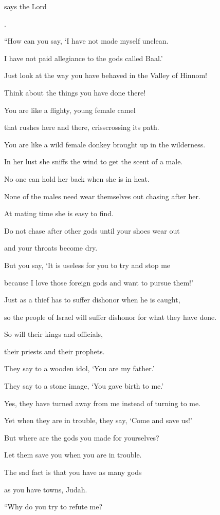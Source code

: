 {\par }{\Q says
the Lord

{}.
\par }{\Q {}“How
can you say,
‘I have not
made myself unclean.
\par }{\Q I have not
paid allegiance
to the gods called Baal.’
\par }{\Q Just look
at the way
you
have behaved in the Valley
of Hinnom!

\par }{\Q Think about the things you have
done
there!
\par }{\Q You are like a flighty,
young female camel
\par }{\Q that rushes here and there, crisscrossing
its path.
\par }{\Q {}You are like a wild female donkey
brought up
in the wilderness.
\par }{\Q In her lust
she sniffs
the wind
to get the scent of a male.

\par }{\Q No
one can
hold her back
when she is
in heat.
\par }{\Q None
of the males need wear themselves out chasing after her.
\par }{\Q At mating time
she is easy
to find.
\par }{\Q {}Do not chase after
other gods until your shoes wear out
\par }{\Q and your throats
become dry.
\par }{\Q But you say,
‘It is useless
for you to try and stop
me
\par }{\Q because
I love
those foreign
gods and want to pursue them!’
\par }{\Q {}Just as a thief
has to suffer dishonor
when
he is caught,
\par }{\Q so
the people
of Israel
will suffer
dishonor
for
what they
have done.

\par }{\Q So will their kings
and officials,
\par }{\Q their priests
and their prophets.
\par }{\Q {}They say
to a wooden
idol, ‘You
are my father.’
\par }{\Q They say to a stone
image, ‘You
gave birth
to me.’

\par }{\Q Yes,
they have
turned
away from me instead of turning
to me.

\par }{\Q Yet when they are in trouble,
they say,
‘Come and save us!’
\par }{\Q {}But where
are the gods
you made
for yourselves?
\par }{\Q Let them save
you when
you are in trouble.
\par }{\Q The sad fact is that
you have as many
gods
\par }{\Q as you have towns,
Judah.
\par }{\Q {}“Why
do you try to refute
me?

}
